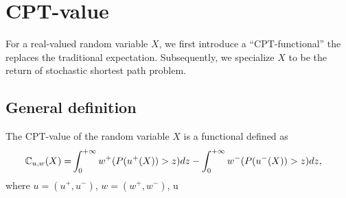 \documentclass[11pt,letterpaper,english]{article}
\begin{document}
\section{CPT-value}
\label{sec:cpt-val}
For a real-valued random variable $X$, we first introduce a ``CPT-functional'' the replaces the traditional expectation. Subsequently, we specialize $X$ to be the return of stochastic shortest path problem.
\subsection{General definition}
The CPT-value of the random variable $X$ is a functional defined as
\begin{align}
\mathbb{C}_{u,w}(X) = &\int_0^{+\infty} w^+(P(u^+(X))>z) dz - \int_0^{+\infty} w^-(P(u^-(X))>z) dz, \label{eq:cpt-general}
\end{align}
where $u=(u^+,u^-)$, $w=(w^+,w^-)$, u 
\end{document}

